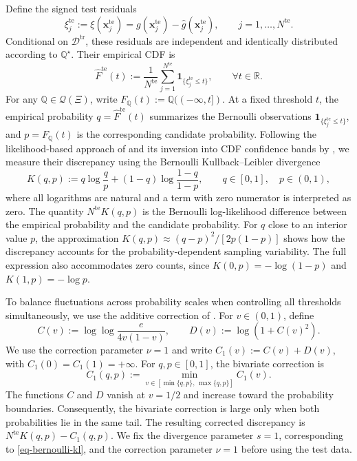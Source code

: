 \documentclass[review,11pt,3p,authoryear,nopreprintline]{elsarticle}
\begin{document}
Define the signed test residuals
\[
  \xi_j^{\mathrm{te}}:=\xi(\bm x_j^{\mathrm{te}})=g(\bm x_j^{\mathrm{te}})-\hat g(\bm x_j^{\mathrm{te}}),\qquad j=1,\ldots,N^{\mathrm{te}}.
\]
Conditional on $\mathcal D^{\mathrm{tr}}$, these residuals are independent and identically distributed according to $\mathbb Q^\star$. Their empirical CDF is
\begin{equation}
  \widehat F^{\mathrm{te}}(t):=\frac{1}{N^{\mathrm{te}}}\sum_{j=1}^{N^{\mathrm{te}}}\mathbf 1_{\{\xi_j^{\mathrm{te}}\le t\}},\qquad \forall t\in\mathbb R.
  \label{eq-empirical-cdf}
\end{equation}
For any $\mathbb Q\in\mathcal Q(\Xi)$, write $F_{\mathbb Q}(t):=\mathbb Q(({-\infty},t])$. At a fixed threshold $t$, the empirical probability $q=\widehat F^{\mathrm{te}}(t)$ summarizes the Bernoulli observations $\mathbf 1_{\{\xi_j^{\mathrm{te}}\le t\}}$, and $p=F_{\mathbb Q}(t)$ is the corresponding candidate probability. Following the likelihood-based approach of \citet{B.J79} and its inversion into CDF confidence bands by \citet{O95}, we measure their discrepancy using the Bernoulli Kullback--Leibler divergence
\begin{equation}
  K(q,p):=q\log\frac{q}{p}+(1-q)\log\frac{1-q}{1-p},\qquad q\in[0,1],\quad p\in(0,1),
  \label{eq-bernoulli-kl}
\end{equation}
where all logarithms are natural and a term with zero numerator is interpreted as zero. The quantity $N^{\mathrm{te}}K(q,p)$ is the Bernoulli log-likelihood difference between the empirical probability and the candidate probability. For $q$ close to an interior value $p$, the approximation $K(q,p)\approx(q-p)^2/[2p(1-p)]$ shows how the discrepancy accounts for the probability-dependent sampling variability. The full expression also accommodates zero counts, since $K(0,p)=-\log(1-p)$ and $K(1,p)=-\log p$.

To balance fluctuations across probability scales when controlling all thresholds simultaneously, we use the additive correction of \citet{L.J23}. For $v\in(0,1)$, define
\begin{equation}
  C(v):=\log\log\frac{e}{4v(1-v)},\qquad D(v):=\log\!\left(1+C(v)^2\right).
  \label{eq-dw-correction-functions}
\end{equation}
We use the correction parameter $\nu=1$ and write $C_1(v):=C(v)+D(v)$, with $C_1(0)=C_1(1)=+\infty$. For $q,p\in[0,1]$, the bivariate correction is
\begin{equation}
  C_1(q,p):=\min_{v\in[\min\{q,p\},\,\max\{q,p\}]}C_1(v).
  \label{eq-dw-bivariate-correction}
\end{equation}
The functions $C$ and $D$ vanish at $v=1/2$ and increase toward the probability boundaries. Consequently, the bivariate correction is large only when both probabilities lie in the same tail. The resulting corrected discrepancy is $N^{\mathrm{te}}K(q,p)-C_1(q,p)$. We fix the divergence parameter $s=1$, corresponding to \eqref{eq-bernoulli-kl}, and the correction parameter $\nu=1$ before using the test data.
\end{document}

